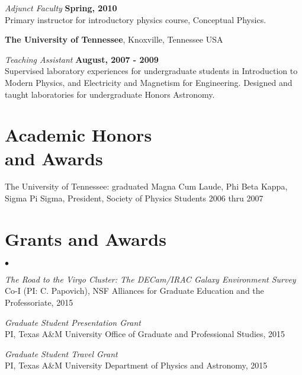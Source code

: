 \documentclass[margin,line, 11pt]{res}
\newenvironment{list2}{
  \begin{list}{$\bullet$}{%
      \setlength{\itemsep}{0in}
      \setlength{\parsep}{0in} \setlength{\parskip}{0in}
      \setlength{\topsep}{0in} \setlength{\partopsep}{0in}
      \setlength{\leftmargin}{0.2in}}}{\end{list}}
\begin{document}
\begin{resume}
\emph{Adjunct Faculty} \hfill \textbf{Spring, 2010}\\
Primary instructor for introductory physics course, Conceptual Physics.

\textbf{The University of Tennessee}, Knoxville, Tennessee USA
\vspace{-3mm}

\emph{Teaching Assistant} \hfill \textbf{August, 2007 - 2009}\\
Supervised laboratory experiences for undergraduate students in Introduction to Modern Physics, and Electricity and Magnetism for Engineering. Designed and taught laboratories for undergraduate Honors Astronomy.
\vspace*{-3mm}

\section{\sc Academic Honors \\and Awards}
The University of Tennessee: graduated Magna Cum Laude, Phi Beta Kappa, Sigma
Pi Sigma, President, Society of Physics Students 2006 thru 2007

\section{\sc Grants and Awards}
\begin{list2}
    \item \emph{The Road to the Virgo Cluster: The DECam/IRAC Galaxy Environment Survey}\\
	Co-I (PI: C. Papovich), NSF Alliances for Graduate Education and the Professoriate, 2015
	\item \emph{Graduate Student Presentation Grant}\\
	PI, Texas A\&M University Office of Graduate and Professional Studies, 2015
	\item \emph{Graduate Student Travel Grant}\\
	PI, Texas A\&M University Department of Physics and Astronomy, 2015
\end{list2}


\end{resume}
\end{document}

